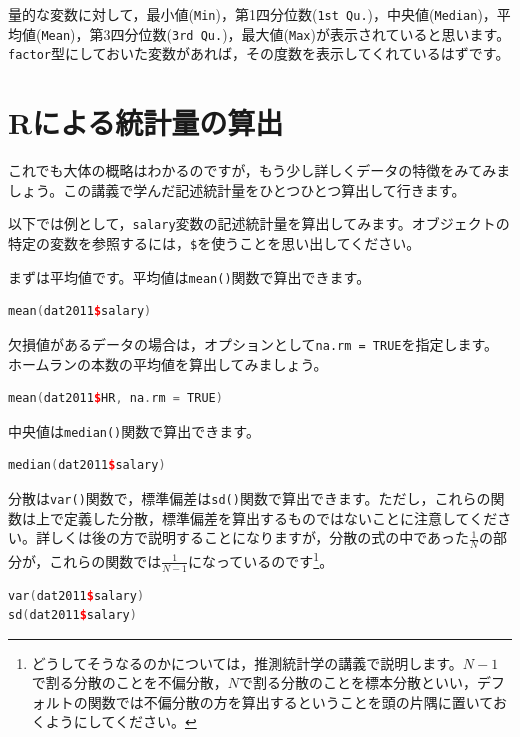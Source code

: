 \documentclass{ltjsbook}
\begin{document}
量的な変数に対して，最小値(\verb|Min|)，第1四分位数(\verb|1st Qu.|)，中央値(\verb|Median|)，平均値(\verb|Mean|)，第3四分位数(\verb|3rd Qu.|)，最大値(\verb|Max|)が表示されていると思います。
\verb|factor|型にしておいた変数があれば，その度数を表示してくれているはずです。

\section{Rによる統計量の算出}
これでも大体の概略はわかるのですが，もう少し詳しくデータの特徴をみてみましょう。この講義で学んだ記述統計量をひとつひとつ算出して行きます。

以下では例として，\verb|salary|変数の記述統計量を算出してみます。オブジェクトの特定の変数を参照するには，\verb|$|を使うことを思い出してください。

まずは平均値です。平均値は\verb|mean()|関数で算出できます。

\begin{lstlisting}[language=c++,label={code:5_04},caption={平均値の算出}]
mean(dat2011$salary)
\end{lstlisting}

欠損値があるデータの場合は，オプションとして\verb|na.rm = TRUE|を指定します。ホームランの本数の平均値を算出してみましょう。

\begin{lstlisting}[language=c++,label={code:5_04_2},caption={平均値の算出}]
mean(dat2011$HR, na.rm = TRUE)
\end{lstlisting}


中央値は\verb|median()|関数で算出できます。

\begin{lstlisting}[language=c++,label={code:5_05},caption={中央値の算出}]
median(dat2011$salary)
\end{lstlisting}

分散は\verb|var()|関数で，標準偏差は\verb|sd()|関数で算出できます。ただし，これらの関数は上で定義した分散，標準偏差を算出するものではないことに注意してください。詳しくは後の方で説明することになりますが，分散の式の中であった$\frac{1}{N}$の部分が，これらの関数では$\frac{1}{N-1}$になっているのです\footnote{どうしてそうなるのかについては，推測統計学の講義で説明します。$N-1$で割る分散のことを不偏分散，$N$で割る分散のことを標本分散といい，デフォルトの関数では不偏分散の方を算出するということを頭の片隅に置いておくようにしてください。}。

\begin{lstlisting}[language=c++,label={code:5_06},caption={分散と標準偏差の算出}]
var(dat2011$salary)
sd(dat2011$salary)
\end{lstlisting}
\end{document}
